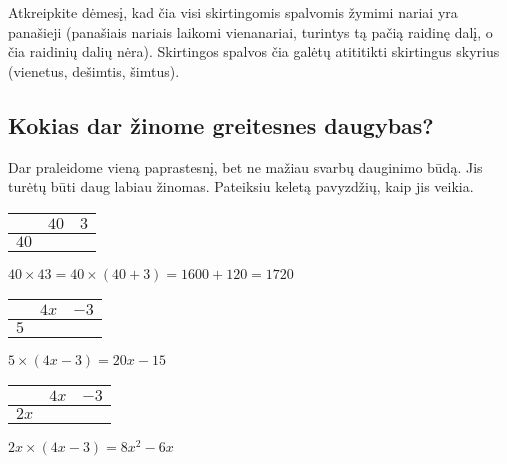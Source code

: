\documentclass[a4paper]{article}
\newcommand{\high}[1]{\cellcolor{orange!80!white}{#1}}
\newcommand{\midd}[1]{\cellcolor{green!50!white}{#1}}
\begin{document}
Atkreipkite dėmesį, kad čia visi skirtingomis spalvomis žymimi nariai yra panašieji (panašiais nariais laikomi vienanariai, turintys tą pačią raidinę dalį, o čia raidinių dalių nėra). Skirtingos spalvos čia galėtų atititikti skirtingus skyrius (vienetus, dešimtis, šimtus).
\subsection{Kokias dar žinome greitesnes daugybas?}
Dar praleidome vieną paprastesnį, bet ne mažiau svarbų dauginimo būdą. Jis turėtų būti daug labiau žinomas. Pateiksiu keletą pavyzdžių, kaip jis veikia.
\newline\newline
\begin{minipage}[b]{0.3\linewidth}
\begin{center}
\begin{tabular}{c||c|c}
 & $40$ & $3$ \\ \hline \hline
 $40$ & \high{$1600$} & \midd{$120$}\\ \hline 
\end{tabular}
\newline\newline\newline
$40 \times 43 = 40 \times (40 + 3)= 1600 + 120 = 1720$
\end{center}
\end{minipage}
\begin{minipage}[b]{0.3\linewidth}
\begin{center}
\begin{tabular}{c||c|c}
 & $4x$ & $-3$ \\ \hline \hline
 $5$ & \high{$20x$} & \midd{$-15$}\\ \hline 
\end{tabular}
\newline\newline\newline
$5 \times (4x - 3) = 20x - 15$
\end{center}
\end{minipage}
\begin{minipage}[b]{0.3\linewidth}
\begin{center}
\begin{tabular}{c||c|c}
 & $4x$ & $-3$ \\ \hline \hline
 $2x$ & \high{$8x^2$} & \midd{$-6x$}\\ \hline 
\end{tabular}
\newline\newline\newline
$2x \times (4x - 3) = 8x^2 - 6x$
\end{center}
\end{minipage}
\end{document}
